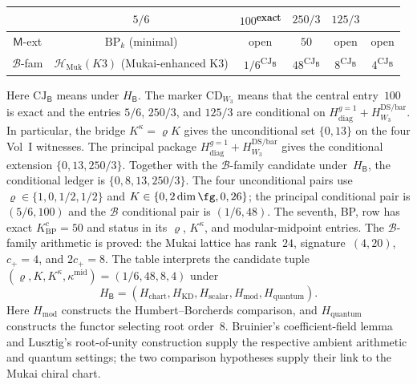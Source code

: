 \begin{proposition}
\begin{center}
\begin{tabular}{|c|c|c|c|c|c|}
 & $5/6$ & $100$\textsuperscript{exact} & $250/3$ & $125/3$ \\
\hline
$\mathsf{M}$-ext & $\mathrm{BP}_k$ (minimal) & open & $50$ & open & open \\
\hline
\hline
$\mathcal{B}$-fam & $\mathcal{H}_{\mathrm{Muk}}(K3)$ (Mukai-enhanced K3)
 & $1/6$\textsuperscript{$\mathrm{CJ}_{\mathsf B}$}
 & $48$\textsuperscript{$\mathrm{CJ}_{\mathsf B}$}
 & $8$\textsuperscript{$\mathrm{CJ}_{\mathsf B}$}
 & $4$\textsuperscript{$\mathrm{CJ}_{\mathsf B}$} \\
\hline
\end{tabular}
\end{center}
Here $\mathrm{CJ}_{\mathsf B}$ means \ClaimStatusConjectured under
$H_{\mathsf B}$.
The marker $\mathrm{CD}_{W_3}$ means that the central entry~$100$ is
exact and the entries $5/6$, $250/3$, and $125/3$ are conditional on
$H_{\mathrm{diag}}^{g=1}+H_{W_3}^{\mathrm{DS/bar}}$.
In particular, the bridge $K^\kappa=\varrho K$ gives the
unconditional set $\{0,13\}$ on the four Vol~I witnesses.  The
principal package
$H_{\mathrm{diag}}^{g=1}+H_{W_3}^{\mathrm{DS/bar}}$ gives the
conditional extension $\{0,13,250/3\}$.  Together with the
$\mathcal B$-family candidate under~$H_{\mathsf B}$, the conditional
ledger is $\{0,8,13,250/3\}$.  The four unconditional pairs use
$\varrho\in\{1,0,1/2,1/2\}$ and
$K\in\{0,2\dim\fg,0,26\}$; the principal conditional pair is
$(5/6,100)$ and the $\mathcal B$ conditional pair is $(1/6,48)$.
The seventh, BP, row has exact
$K^c_{\mathrm{BP}}=50$ and status \ClaimStatusOpen in its $\varrho$,
$K^\kappa$, and modular-midpoint entries.  The $\mathcal B$-family
arithmetic is proved: the Mukai lattice has rank~$24$, signature~$(4,20)$,
$c_+=4$, and $2c_+=8$.  The table interprets the candidate tuple
$(\varrho,K,K^\kappa,\kappa^{\mathrm{mid}})=(1/6,48,8,4)$ under
\[
H_{\mathsf B}
=(H_{\mathrm{chart}},H_{\mathrm{KD}},H_{\mathrm{scalar}},
H_{\mathrm{mod}},H_{\mathrm{quantum}}).
\]
Here $H_{\mathrm{mod}}$ constructs the Humbert--Borcherds comparison,
and $H_{\mathrm{quantum}}$ constructs the functor selecting root
order~$8$.  Bruinier's coefficient-field lemma and Lusztig's
root-of-unity construction supply the respective ambient arithmetic
and quantum settings; the two comparison hypotheses supply their link
to the Mukai chiral chart.
\end{proposition}

